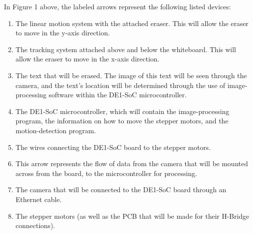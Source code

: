 \documentclass[10pt,onecolumn,draftclsnofoot]{IEEEtran} 					%
\begin{document}
    \setlength{\parindent}{5ex}
    In Figure 1 above, the labeled arrows represent the following listed devices:
    \begin{enumerate}
        \item The linear motion system with the attached eraser. This will allow the eraser to move in the y-axis direction.
        \item The tracking system attached above and below the whiteboard. This will allow the eraser to move in the x-axis direction.
        \item The text that will be erased. The image of this text will be seen through the camera, and the text's location will be determined through the use of image-processing software within the DE1-SoC microcontroller.
        \item The DE1-SoC microcontroller, which will contain the image-processing program, the information on how to move the stepper motors, and the motion-detection program.
        \item The wires connecting the DE1-SoC board to the stepper motors.
        \item This arrow represents the flow of data from the camera that will be mounted across from the board, to the microcontroller for processing.
        \item The camera that will be connected to the DE1-SoC board through an Ethernet cable.
        \item The stepper motors (as well as the PCB that will be made for their H-Bridge connections).
    \end{enumerate}
	
\end{document}
